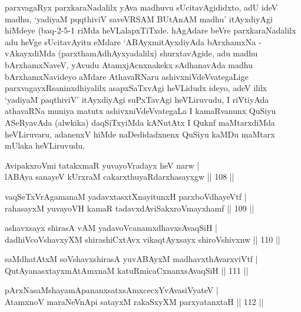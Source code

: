 \begin{artha}
parxvagaRyx parxkaraNadalilx yAva madhuvu 
sUcitavAgididxto, adU ideV madhu, `yadiyaM pqqthiviV saveVRSAM BUtAnAM madhu' itAyxdiyAgi hiMdeye
(baq-2-5-1 riMda heVLalapxTiTxde. hAgAdare beVre parxkaraNadalilx adu
heVge sUcitavAyitu eMdare `ABAyxmitAyxdiyAda bArxhamxNa - vAkayxdiMda (parxthamAdhAyxyadalilx) shurxtavAgide, adu madhu bArxhamxNaveV, yAvudu AtamxjAcnxnakekx sAdhanavAda madhu
bArxhamxNavideyo aMdare AthavaRNaru ashivxniVdeVvategaLige
parxvagayxRsaninxdhiyalilx asapxSaTxvAgi heVLidudx ideyo, adeV ililx
`yadiyaM paqthiviV' itAyxdiyAgi suPxTavAgi heVLiruvudu, I riVtiyAda athavaRNa
muniya matutx ashivxniVdeVvategaLa I kamaRvanunx QuSiyu ASeRyavAda
(alwkika) daqSiTxyiMda kANutAtx I Quknf maMtarxdiMda heVLiruvaru,
adanenxV hiMde naDedidadxnenx QuSiyu kaMDu maMtarx mUlaka heVLiruvudu.
\end{artha}




\begin{shl}
AvipakxroVmi tatakxmaR yuvayoVradayx heV narw |\\
lABAya sanayeV kUrxraM cakarxthuyaRdarxhasayxgw \hfill || 108 ||
\end{shl}
\begin{shl}
vaqSeTxVrAgamanaM yadavxtasxtXnayitunxH parxboVdhayeVtf |\\
rahasayxM yuvayoVH kamaR tadavxdAviSakxroVmayxhamf \hfill || 109 ||
\end{shl}
\begin{shl}
ashavxsayx shirasA vAM yadavoVcanamxdhavxsAvaqSiH |\\
dadhiVcoV\s shavxyXM shirashiCxtAvx vikaqtAyxsayx shiroV\s shivxnw \hfill || 110 ||
\end{shl}
\begin{shl}
saMdhatAtxM soV\s shavxshirasA yuvABAyxM madhavxthAvarxviVtf |\\
QutAyanasxtayxmAtAmxnaM katuRmicaCxnanxsAvaqSiH \hfill || 111 ||
\end{shl}
\begin{shl}
pArxNasaMshayamApananxsatxsAmxcecxYvAvasiVyateV |\\
AtamxnoV maraNeVnApi satayxM rakaSxyXM parxyatanxtaH \hfill || 112 ||
\end{shl}

